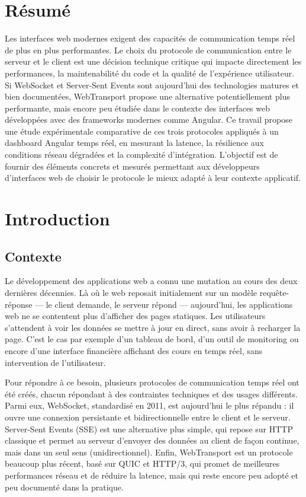 \section*{Résumé}

Les interfaces web modernes exigent des capacités de communication temps réel de plus en plus performantes. Le choix du protocole de communication entre le serveur et le client est une décision technique critique qui impacte directement les performances, la maintenabilité du code et la qualité de l'expérience utilisateur. Si WebSocket et Server-Sent Events sont aujourd'hui des technologies matures et bien documentées, WebTransport propose une alternative potentiellement plus performante, mais encore peu étudiée dans le contexte des interfaces web développées avec des frameworks modernes comme Angular. Ce travail propose une étude expérimentale comparative de ces trois protocoles appliqués à un dashboard Angular temps réel, en mesurant la latence, la résilience aux conditions réseau dégradées et la complexité d'intégration. L'objectif est de fournir des éléments concrets et mesurés permettant aux développeurs d'interfaces web de choisir le protocole le mieux adapté à leur contexte applicatif.

\section{Introduction}

\subsection{Contexte}

Le développement des applications web a connu une mutation au cours des deux dernières décennies. Là où le web reposait initialement sur un modèle requête-réponse --- le client demande, le serveur répond --- aujourd'hui, les applications web ne se contentent plus d'afficher des pages statiques. Les utilisateurs s'attendent à voir les données se mettre à jour en direct, sans avoir à recharger la page. C'est le cas par exemple d'un tableau de bord, d'un outil de monitoring ou encore d'une interface financière affichant des cours en temps réel, sans intervention de l'utilisateur.

Pour répondre à ce besoin, plusieurs protocoles de communication temps réel ont été créés, chacun répondant à des contraintes techniques et des usages différents. Parmi eux, WebSocket, standardisé en 2011, est aujourd'hui le plus répandu : il ouvre une connexion persistante et bidirectionnelle entre le client et le serveur. Server-Sent Events (SSE) est une alternative plus simple, qui repose sur HTTP classique et permet au serveur d'envoyer des données au client de façon continue, mais dans un seul sens (unidirectionnel). Enfin, WebTransport est un protocole beaucoup plus récent, basé sur QUIC et HTTP/3, qui promet de meilleures performances réseau et de réduire la latence, mais qui reste encore peu adopté et peu documenté dans la pratique.


